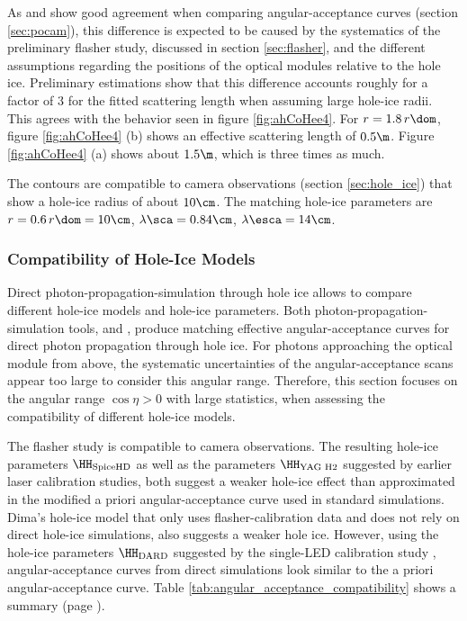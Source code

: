 As \clsim and \ppc show good agreement when comparing angular-acceptance curves (section \ref{sec:pocam}), this difference is expected to be caused by the systematics of the preliminary flasher study, discussed in section \ref{sec:flasher}, and the different assumptions regarding the positions of the optical modules relative to the hole ice. Preliminary estimations show that this difference accounts roughly for a factor of $3$ for the fitted scattering length when assuming large hole-ice radii.
This agrees with the behavior seen in figure \ref{fig:ahCoHee4}.
For $r=1.8\,r\dom$, figure \ref{fig:ahCoHee4} (b) shows an effective scattering length of $0.5\m$. Figure \ref{fig:ahCoHee4} (a) shows about $1.5\m$, which is three times as much.


The  contours are compatible to camera observations (section \ref{sec:hole_ice}) that show a hole-ice radius of about $10\cm$. \cite{rongenswedishcamera} The matching  hole-ice parameters are $r = 0.6\,r\dom = 10\cm$, $\lambda\sca = 0.84\cm$, $\lambda\esca = 14\cm$. \cite{martinspicehddard}

\subsubsection{Compatibility of Hole-Ice Models}
\label{sec:compatibility_of_hole_ice_parameters}

Direct photon-propagation-simulation through hole ice allows to compare different hole-ice models and hole-ice parameters.
Both photon-propagation-simulation tools, \ppc and \clsim, produce matching effective angular-acceptance curves for direct photon propagation through hole ice. For photons approaching the optical module from above, the systematic uncertainties of the \clsim angular-acceptance scans appear too large to consider this angular range. Therefore, this section focuses on the angular range $\cos \eta > 0$ with large statistics, when assessing the compatibility of different hole-ice models.

The  flasher study is compatible to camera observations. The resulting hole-ice parameters $\HH_\text{SpiceHD}$ as well as the parameters $\HH_\text{YAG H2}$ suggested by earlier laser calibration studies, both suggest a weaker hole-ice effect than approximated in the modified a priori angular-acceptance curve used in standard \clsim simulations. Dima's hole-ice model that only uses flasher-calibration data and does not rely on direct hole-ice simulations, also suggests a weaker hole ice.
However, using the hole-ice parameters $\HH_\text{DARD}$ suggested by the single-LED calibration study , angular-acceptance curves from direct simulations look similar to the a priori angular-acceptance curve. Table \ref{tab:angular_acceptance_compatibility} shows a summary (page \pageref{tab:angular_acceptance_compatibility}).

